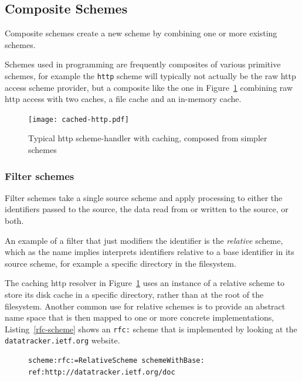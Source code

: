 \documentclass{acm_proc_article-sp}
\begin{document}
\subsection{Composite Schemes}
\label{compositeSchemes}
Composite schemes  create a new scheme by combining one or 
more existing schemes. 

 Schemes used in programming 
are frequently composites of various primitive schemes, for example
the {\tt http} scheme will typically not actually be the raw http access
scheme provider, but a composite like the one in Figure~\ref{fig:http-cached} combining
raw http access with two caches, a file cache and an in-memory cache.


\begin{figure}[htbp]
\centering
\texttt{[image: cached-http.pdf]}
\caption{Typical http scheme-handler with caching, composed from simpler schemes}
\label{fig:http-cached}

\end{figure}


\subsubsection{Filter schemes}
\label{filterschemes}
Filter schemes take a single source scheme and apply processing to either
the identifiers passed to the source,  the data read from or written to the source, or both.

An example of a filter that just modifiers the identifier is the \emph{relative}
scheme, which as the name implies interprets identifiers relative to a base
identifier in its source scheme, for example a specific directory in the
filesystem.  

The caching http resolver in Figure~\ref{fig:http-cached} uses an instance
of a relative scheme to store its disk cache in a specific directory, rather
than at the root of the filesystem.  Another common use for relative schemes
is to provide an abstract name space that is then mapped to one
or more  concrete implementations, Listing~\ref{rfc-scheme} shows
an {\tt rfc:} scheme that is implemented by looking at the {\tt datatracker.ietf.org}
website.


\begin{figure}[htbp]
\begin{lstlisting}[style=numbers,label=rfc-scheme,caption=Defining a custom rfc: scheme.]
scheme:rfc:=RelativeScheme schemeWithBase: ref:http://datatracker.ietf.org/doc
\end{lstlisting}
\end{figure}
\end{document}
